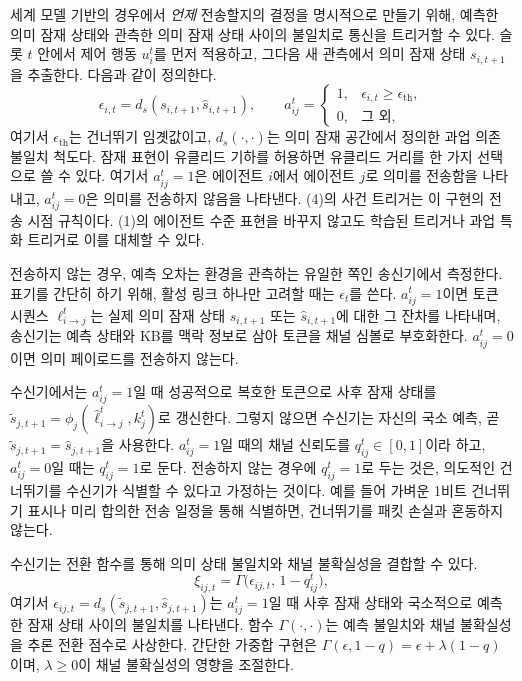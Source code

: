 세계 모델 기반의 경우에서 \textit{언제} 전송할지의 결정을 명시적으로 만들기 위해, 예측한 의미 잠재 상태와 관측한 의미 잠재 상태 사이의 불일치로 통신을 트리거할 수 있다.
슬롯 $t$ 안에서 제어 행동 $u_i^t$를 먼저 적용하고, 그다음 새 관측에서 의미 잠재 상태 $s_{i,t+1}$을 추출한다.
다음과 같이 정의한다.
\begin{equation}
\epsilon_{i,t} = d_s(s_{i,t+1}, \hat{s}_{i,t+1}), \qquad
a_{ij}^t =
\begin{cases}
1, & \epsilon_{i,t} \ge \epsilon_{\mathrm{th}},\\
0, & \text{그 외},
\end{cases} \tag{4}
\end{equation}
여기서 $\epsilon_{\mathrm{th}}$는 건너뛰기 임곗값이고, $d_s(\cdot,\cdot)$는 의미 잠재 공간에서 정의한 과업 의존 불일치 척도다.
잠재 표현이 유클리드 기하를 허용하면 유클리드 거리를 한 가지 선택으로 쓸 수 있다.
여기서 $a_{ij}^t = 1$은 에이전트 $i$에서 에이전트 $j$로 의미를 전송함을 나타내고, $a_{ij}^t = 0$은 의미를 전송하지 않음을 나타낸다.
(4)의 사건 트리거는 이 구현의 전송 시점 규칙이다.
(1)의 에이전트 수준 표현을 바꾸지 않고도 학습된 트리거나 과업 특화 트리거로 이를 대체할 수 있다.

전송하지 않는 경우, 예측 오차는 환경을 관측하는 유일한 쪽인 송신기에서 측정한다.
표기를 간단히 하기 위해, 활성 링크 하나만 고려할 때는 $\epsilon_t$를 쓴다.
$a_{ij}^t = 1$이면 토큰 시퀀스 $\ell_{i\to j}^t$는 실제 의미 잠재 상태 $s_{i,t+1}$ 또는 $\hat{s}_{i,t+1}$에 대한 그 잔차를 나타내며, 송신기는 예측 상태와 KB를 맥락 정보로 삼아 토큰을 채널 심볼로 부호화한다.
$a_{ij}^t = 0$이면 의미 페이로드를 전송하지 않는다.

수신기에서는 $a_{ij}^t = 1$일 때 성공적으로 복호한 토큰으로 사후 잠재 상태를 $\tilde{s}_{j,t+1} = \phi_j(\hat{\ell}_{i\to j}^t, k_j^t)$로 갱신한다.
그렇지 않으면 수신기는 자신의 국소 예측, 곧 $\tilde{s}_{j,t+1} = \hat{s}_{j,t+1}$을 사용한다.
$a_{ij}^t = 1$일 때의 채널 신뢰도를 $q_{ij}^t \in [0,1]$이라 하고, $a_{ij}^t = 0$일 때는 $q_{ij}^t = 1$로 둔다.
전송하지 않는 경우에 $q_{ij}^t = 1$로 두는 것은, 의도적인 건너뛰기를 수신기가 식별할 수 있다고 가정하는 것이다.
예를 들어 가벼운 1비트 건너뛰기 표시나 미리 합의한 전송 일정을 통해 식별하면, 건너뛰기를 패킷 손실과 혼동하지 않는다.

수신기는 전환 함수를 통해 의미 상태 불일치와 채널 불확실성을 결합할 수 있다.
\begin{equation}
\xi_{ij,t} = \Gamma\bigl(\epsilon_{ij,t},\, 1 - q_{ij}^t\bigr), \tag{5}
\end{equation}
여기서 $\epsilon_{ij,t} = d_s(\tilde{s}_{j,t+1}, \hat{s}_{j,t+1})$는 $a_{ij}^t = 1$일 때 사후 잠재 상태와 국소적으로 예측한 잠재 상태 사이의 불일치를 나타낸다.
함수 $\Gamma(\cdot,\cdot)$는 예측 불일치와 채널 불확실성을 추론 전환 점수로 사상한다.
간단한 가중합 구현은 $\Gamma(\epsilon, 1-q) = \epsilon + \lambda(1-q)$이며, $\lambda \ge 0$이 채널 불확실성의 영향을 조절한다.

